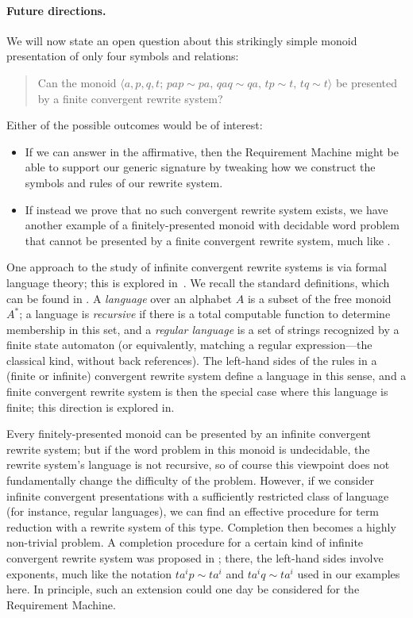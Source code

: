 \documentclass[../generics]{subfiles}
\begin{document}
\begin{example}
\paragraph{Future directions.} We will now state an open question about this strikingly simple monoid presentation of only four symbols and relations:
\begin{quote}
Can the monoid $\langle a,p,q,t;\,pap\sim pa,\, qaq\sim qa,\, tp\sim t,\, tq\sim t\rangle$ be presented by a finite convergent rewrite system?
\end{quote}
Either of the possible outcomes would be of interest:
\begin{itemize}
\item If we can answer in the affirmative, then the Requirement Machine might be able to support our generic signature by tweaking how we construct the symbols and rules of our rewrite system.
\item If instead we prove that no such convergent rewrite system exists, we have another example of a finitely-presented monoid with decidable word problem that cannot be presented by a finite convergent rewrite system, much like .
\end{itemize}

One approach to the study of infinite convergent rewrite systems is via formal language theory; this is explored in~\cite{OTTO1998621}. We recall the standard definitions, which can be found in \cite{formalmans1}. A \emph{language} over an alphabet $A$ is a subset of the free monoid $A^*$; a language is \emph{recursive} if there is a total computable function to determine membership in this set, and a \emph{regular language} is a set of strings recognized by a finite state automaton (or equivalently, matching a regular expression---the classical kind, without back references). The left-hand sides of the rules in a (finite or infinite) convergent rewrite system define a language in this sense, and a finite convergent rewrite system is then the special case where this language is finite; this direction is explored in.

Every finitely-presented monoid can be presented by an infinite convergent rewrite system; but if the word problem in this monoid is undecidable, the rewrite system's language is not recursive, so of course this viewpoint does not fundamentally change the difficulty of the problem. However, if we consider infinite convergent presentations with a sufficiently restricted class of language (for instance, regular languages), we can find an effective procedure for term reduction with a rewrite system of this type. Completion then becomes a highly non-trivial problem. A completion procedure for a certain kind of infinite convergent rewrite system was proposed in \cite{NEEDHAM1996195}; there, the left-hand sides involve exponents, much like the notation $ta^ip\sim ta^i$ and $ta^iq\sim ta^i$ used in our examples here. In principle, such an extension could one day be considered for the Requirement Machine.
\end{example}
\end{document}
